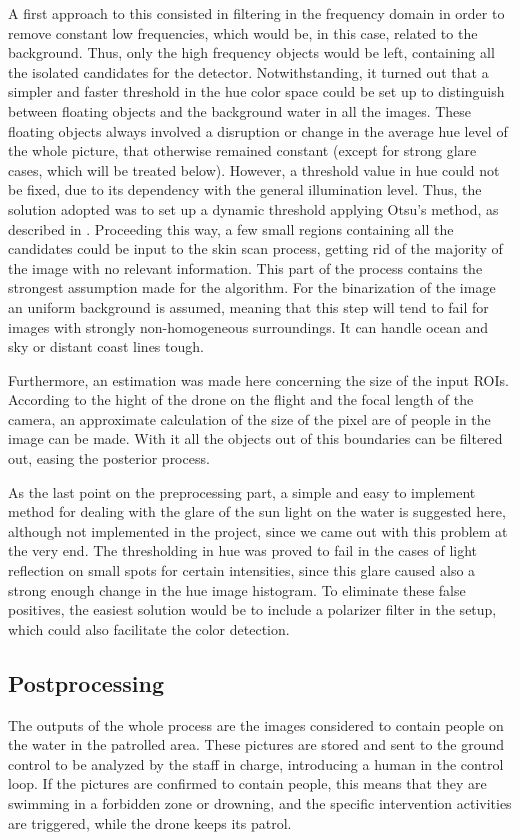 A first approach to this consisted in filtering in the frequency domain in order to remove constant low frequencies, which would be, in this case, related to the background. Thus, only the high frequency objects would be left, containing all the isolated candidates for the detector.
Notwithstanding, it turned out that a simpler and faster threshold in the hue color space could be set up to distinguish between floating objects and the background water in all the images. 
These floating objects always involved a disruption or change in the average hue level of the whole picture, that otherwise remained constant (except for strong glare cases, which will be treated below).
However, a threshold value in hue could not be fixed, due to its dependency with the general illumination level. 
Thus, the solution adopted was to set up a dynamic threshold applying Otsu's method, as described in \cite{Ref:Otsu}.
Proceeding this way, a few small regions containing all the candidates could be input to the skin scan process, getting rid of the majority of the image with no relevant information. 
This part of the process contains the strongest assumption made for the algorithm. 
For the binarization of the image an uniform background is assumed, meaning that this step will tend to fail for images with strongly non-homogeneous surroundings. 
It can handle ocean and sky or distant coast lines tough. 

Furthermore, an estimation was made here concerning the size of the input ROIs. 
According to the hight of the drone on the flight and the focal length of the camera, an approximate calculation of the size of the pixel are of people in the image can be made. 
With it all the objects out of this boundaries can be filtered out, easing the posterior process.

As the last point on the preprocessing part, a simple and easy to implement method for dealing with the glare of the sun light on the water is suggested here, although not implemented in the project, since we came out with this problem at the very end.
The thresholding in hue was proved to fail in the cases of light reflection on small spots for certain intensities, since this glare caused also a strong enough change in the hue image histogram. To eliminate these false positives, the easiest solution would be to include a polarizer filter in the setup, which could also facilitate the color detection. 

\subsection{Postprocessing}
The outputs of the whole process are the images considered to contain people on the water in the patrolled area. 
These pictures are stored and sent to the ground control to be analyzed by the staff in charge, introducing a human in the control loop.
If the pictures are confirmed to contain people, this means that they are swimming in a forbidden zone or drowning, and the specific intervention activities are triggered, while the drone keeps its patrol. 


